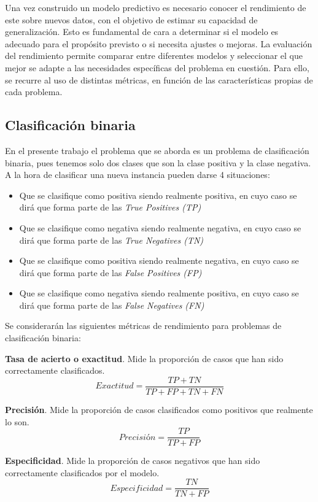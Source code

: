 \documentclass[12pt,a4paper,]{book}
\numberwithin{dummy}{section}
\theoremstyle{ocrenumbox}
\theoremstyle{blacknumex}
\theoremstyle{blacknumbox}
\theoremstyle{ocrenum}
\theoremstyle{ocrenum}
\begin{document}
Una vez construido un modelo predictivo es necesario conocer el
rendimiento de este sobre nuevos datos, con el objetivo de estimar su
capacidad de generalización. Esto es fundamental de cara a determinar si
el modelo es adecuado para el propósito previsto o si necesita ajustes o
mejoras. La evaluación del rendimiento permite comparar entre diferentes
modelos y seleccionar el que mejor se adapte a las necesidades
específicas del problema en cuestión. Para ello, se recurre al uso de
distintas métricas, en función de las características propias de cada
problema.

\hypertarget{clasificaciuxf3n-binaria}{%
\subsection{Clasificación binaria}\label{clasificaciuxf3n-binaria}}

En el presente trabajo el problema que se aborda es un problema de
clasificación binaria, pues tenemos solo dos clases que son la clase
positiva y la clase negativa. A la hora de clasificar una nueva
instancia pueden darse 4 situaciones:

\begin{itemize}
\item
  Que se clasifique como positiva siendo realmente positiva, en cuyo
  caso se dirá que forma parte de las \emph{True Positives (TP)}
\item
  Que se clasifique como negativa siendo realmente negativa, en cuyo
  caso se dirá que forma parte de las \emph{True Negatives (TN)}
\item
  Que se clasifique como positiva siendo realmente negativa, en cuyo
  caso se dirá que forma parte de las \emph{False Positives (FP)}
\item
  Que se clasifique como negativa siendo realmente positiva, en cuyo
  caso se dirá que forma parte de las \emph{False Negatives (FN)}
\end{itemize}

Se considerarán las siguientes métricas de rendimiento para problemas de
clasificación binaria:

\textbf{Tasa de acierto o exactitud}. Mide la proporción de casos que
han sido correctamente clasificados.
\[Exactitud = \frac{TP + TN}{TP + FP + TN + FN}\]

\textbf{Precisión}. Mide la proporción de casos clasificados como
positivos que realmente lo son. \[ Precisión = \frac{TP}{TP + FP}\]

\textbf{Especificidad}. Mide la proporción de casos negativos que han
sido correctamente clasificados por el modelo.
\[ Especificidad = \frac{TN}{TN + FP}\]
\end{document}
